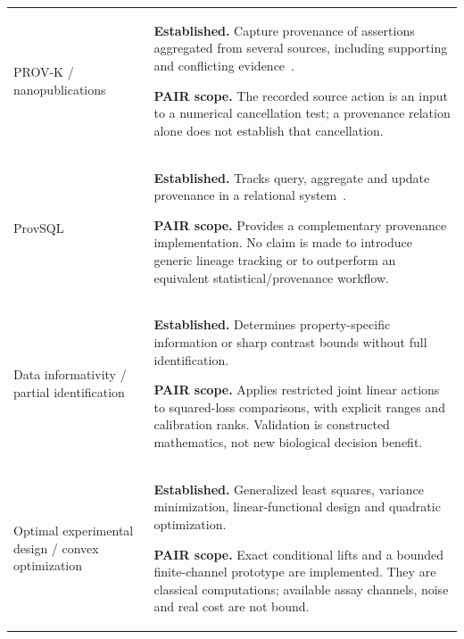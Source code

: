 \documentclass[11pt]{article}
\begin{document}
\begin{longtable}{@{}>{\raggedright\arraybackslash}p{}>{\raggedright\arraybackslash}p{}@{}}
PROV-K / nanopublications & \textbf{Established.} Capture provenance of assertions aggregated from several sources, including supporting and conflicting evidence~\cite{menotti2025provenance}. \par\smallskip\textbf{PAIR scope.} The recorded source action is an input to a numerical cancellation test; a provenance relation alone does not establish that cancellation.  \\
ProvSQL & \textbf{Established.} Tracks query, aggregate and update provenance in a relational system~\cite{sen2026provsql}. \par\smallskip\textbf{PAIR scope.} Provides a complementary provenance implementation. No claim is made to introduce generic lineage tracking or to outperform an equivalent statistical/provenance workflow.  \\
Data informativity / partial identification~\cite{vanwaarde2020informativity,choi2026direct} & \textbf{Established.} Determines property-specific information or sharp contrast bounds without full identification. \par\smallskip\textbf{PAIR scope.} Applies restricted joint linear actions to squared-loss comparisons, with explicit ranges and calibration ranks. Validation is constructed mathematics, not new biological decision benefit.  \\
Optimal experimental design / convex optimization~\cite{boyd2004convex,sagnol2009design} & \textbf{Established.} Generalized least squares, variance minimization, linear-functional design and quadratic optimization. \par\smallskip\textbf{PAIR scope.} Exact conditional lifts and a bounded finite-channel prototype are implemented. They are classical computations; available assay channels, noise and real cost are not bound.  \\
\bottomrule
\end{longtable}
\endgroup
\end{document}
